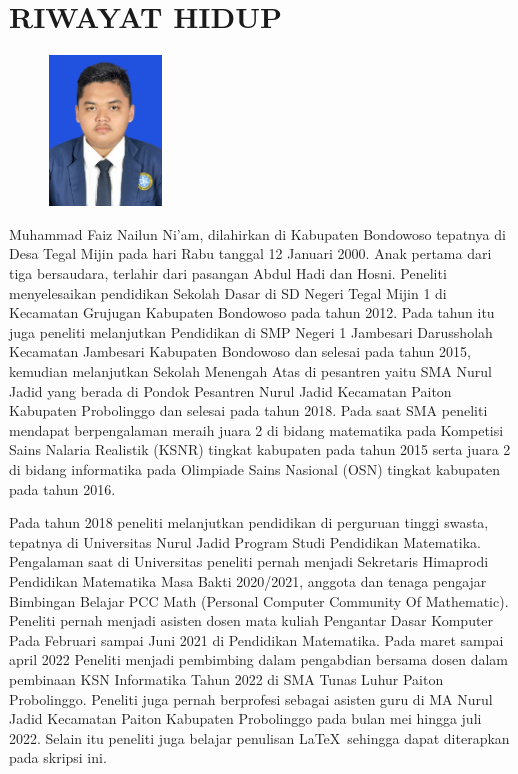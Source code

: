\newpage
\chapter*{RIWAYAT HIDUP}

\noindent
\begin{figure}
\includegraphics[width=3cm, height=4cm]{Gambar/pas foto.jpg} 
\end{figure}

Muhammad Faiz Nailun Ni'am, dilahirkan di Kabupaten Bondowoso tepatnya di Desa Tegal Mijin pada hari Rabu tanggal 12 Januari 2000. Anak pertama dari tiga bersaudara, terlahir dari pasangan Abdul Hadi dan Hosni. Peneliti menyelesaikan pendidikan Sekolah Dasar di SD Negeri Tegal Mijin 1 di Kecamatan Grujugan Kabupaten Bondowoso pada tahun 2012. Pada tahun itu juga peneliti melanjutkan Pendidikan di SMP Negeri 1 Jambesari Darussholah Kecamatan Jambesari Kabupaten Bondowoso dan selesai pada tahun 2015, kemudian melanjutkan Sekolah Menengah Atas di pesantren yaitu SMA Nurul Jadid yang berada di Pondok Pesantren Nurul Jadid Kecamatan Paiton Kabupaten Probolinggo dan selesai pada tahun 2018. Pada saat SMA peneliti mendapat berpengalaman meraih juara 2 di bidang matematika pada Kompetisi Sains Nalaria Realistik (KSNR) tingkat kabupaten pada tahun 2015 serta juara 2 di bidang informatika pada Olimpiade Sains Nasional (OSN) tingkat kabupaten pada tahun 2016.

Pada tahun 2018 peneliti melanjutkan pendidikan di perguruan tinggi swasta, tepatnya di Universitas Nurul Jadid Program Studi Pendidikan Matematika. Pengalaman saat di Universitas peneliti pernah menjadi Sekretaris Himaprodi Pendidikan Matematika Masa Bakti 2020/2021, anggota dan tenaga pengajar Bimbingan Belajar PCC Math (Personal Computer Community Of Mathematic). Peneliti pernah menjadi asisten dosen mata kuliah Pengantar Dasar Komputer Pada Februari sampai Juni 2021 di Pendidikan Matematika. Pada maret sampai april 2022 Peneliti menjadi pembimbing dalam pengabdian bersama dosen dalam pembinaan KSN Informatika Tahun 2022 di SMA Tunas Luhur Paiton Probolinggo. Peneliti juga pernah berprofesi sebagai asisten guru di MA Nurul Jadid Kecamatan Paiton Kabupaten Probolinggo pada bulan mei hingga juli 2022. Selain itu peneliti juga belajar penulisan \LaTeX\ sehingga dapat diterapkan pada skripsi ini.